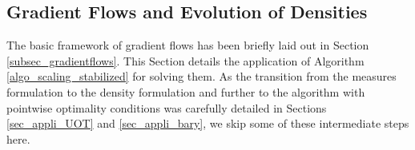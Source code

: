 
\subsection{Gradient Flows and Evolution of Densities}
\label{sec_applicationGF}

The basic framework of gradient flows has been briefly laid out in Section \ref{subsec_gradientflows}. This Section details the application of Algorithm \ref{algo_scaling_stabilized} for solving them.
As the transition from the measures formulation to the density formulation and further to the algorithm with pointwise optimality conditions was carefully detailed in Sections \ref{sec_appli_UOT} and \ref{sec_appli_bary}, we skip some of these intermediate steps here.

